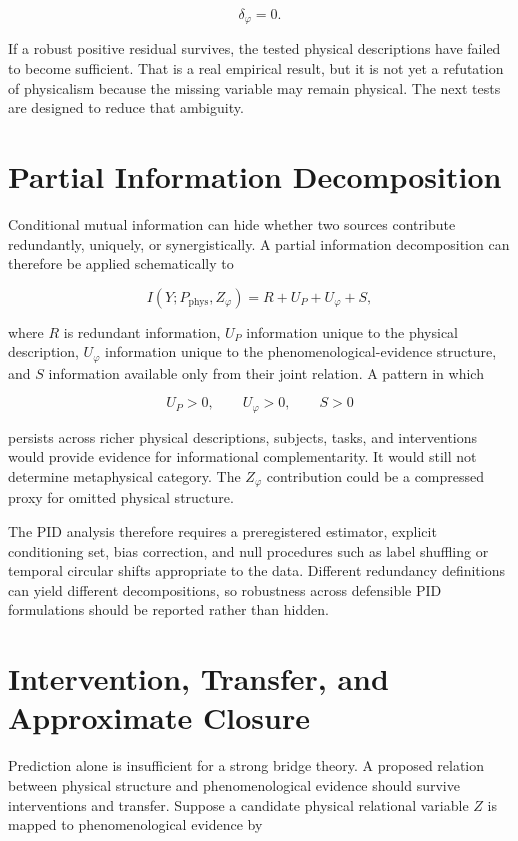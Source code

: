 \[
\delta_\varphi=0.
\]

If a robust positive residual survives, the tested physical descriptions have failed to become sufficient. That is a real empirical result, but it is not yet a refutation of physicalism because the missing variable may remain physical. The next tests are designed to reduce that ambiguity.

\section{Partial Information Decomposition}

Conditional mutual information can hide whether two sources contribute redundantly, uniquely, or synergistically. A partial information decomposition can therefore be applied schematically to

\[
I(Y;P_{\mathrm{phys}},Z_\varphi)=R+U_P+U_\varphi+S,
\]

where $R$ is redundant information, $U_P$ information unique to the physical description, $U_\varphi$ information unique to the phenomenological-evidence structure, and $S$ information available only from their joint relation. A pattern in which

\[
U_P>0,\qquad U_\varphi>0,\qquad S>0
\]

persists across richer physical descriptions, subjects, tasks, and interventions would provide evidence for informational complementarity. It would still not determine metaphysical category. The $Z_\varphi$ contribution could be a compressed proxy for omitted physical structure.

The PID analysis therefore requires a preregistered estimator, explicit conditioning set, bias correction, and null procedures such as label shuffling or temporal circular shifts appropriate to the data. Different redundancy definitions can yield different decompositions, so robustness across defensible PID formulations should be reported rather than hidden.

\section{Intervention, Transfer, and Approximate Closure}

Prediction alone is insufficient for a strong bridge theory. A proposed relation between physical structure and phenomenological evidence should survive interventions and transfer. Suppose a candidate physical relational variable $Z$ is mapped to phenomenological evidence by

